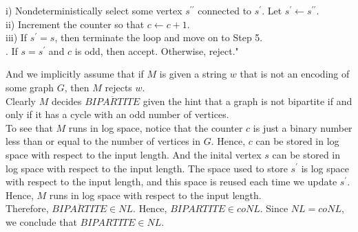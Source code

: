 \documentclass[12pt]{article}
\begin{document}
\indent \indent \indent i) Nondeterministically select some vertex $s^{\prime \prime}$ connected to $s^\prime$. Let $s^\prime \leftarrow s^{\prime \prime}$. \\
\indent \indent \indent ii) Increment the counter so that $c \leftarrow c + 1$. \\
\indent \indent \indent iii) If $s^\prime = s$, then terminate the loop and move on to Step 5. \\

. If $s = s^\prime$ and $c$ is odd, then accept. Otherwise, reject." \\

\setlength\parindent{0pt}

And we implicitly assume that if $M$ is given a string $w$ that is not an encoding of some graph $G$, then $M$ rejects $w$. \\ 

Clearly $M$ decides $\overline{BIPARTITE}$ given the hint that a graph is not bipartite if and only if it has a cycle with an odd number of vertices. \\

To see that $M$ runs in log space, notice that the counter $c$ is just a binary number less than or equal to the number of vertices in $G$. Hence, $c$ can be stored in log space with respect to the input length. And the inital vertex $s$ can be stored in log space with respect to the input length. The space used to store $s^\prime$ is log space with respect to the input length, and this space is reused each time we update $s^\prime$. Hence, $M$ runs in log space with respect to the input length. \\

Therefore, $\overline{BIPARTITE} \in NL$. Hence, $BIPARTITE \in coNL$. Since $NL = coNL$, we conclude that $BIPARTITE \in NL$. 
\end{document}
